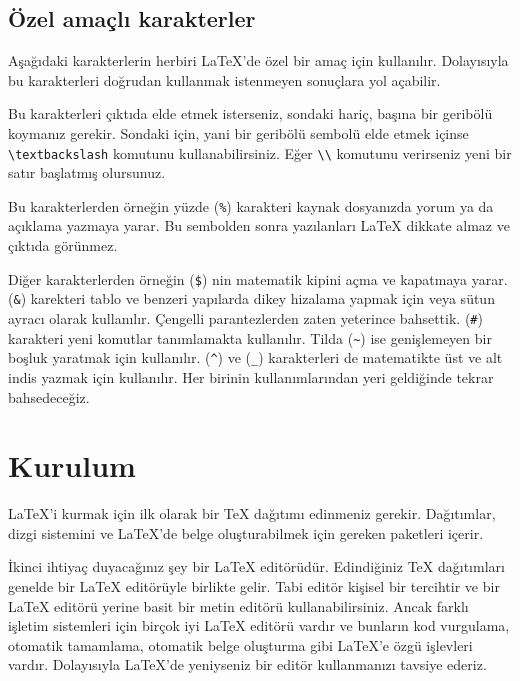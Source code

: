 \documentclass[
  10pt,
]{scrbook}
\newenvironment{Shaded}{\begin{snugshade}}{\end{snugshade}}
\newcommand{\CommentTok}[1]{\textcolor[rgb]{0.56,0.35,0.01}{\textit{#1}}}
\newcommand{\NormalTok}[1]{#1}
\newcommand{\SpecialStringTok}[1]{\textcolor[rgb]{0.31,0.60,0.02}{#1}}
\theoremstyle{definition}
\theoremstyle{definition}
\theoremstyle{definition}
\theoremstyle{definition}
\theoremstyle{remark}
\begin{document}
\hypertarget{uxf6zel-amauxe7lux131-karakterler}{%
\subsection{Özel amaçlı karakterler}\label{uxf6zel-amauxe7lux131-karakterler}}

Aşağıdaki karakterlerin herbiri LaTeX'de özel bir amaç için kullanılır.
Dolayısıyla bu karakterleri doğrudan kullanmak istenmeyen sonuçlara yol
açabilir.

\begin{Shaded}
\begin{Highlighting}[]
\NormalTok{\# }\SpecialStringTok{$ }\CommentTok{\%   \&   \{   \}   \textasciitilde{}  \^{}  \_ \textbackslash{}}
\end{Highlighting}
\end{Shaded}

Bu karakterleri çıktıda elde etmek isterseniz, sondaki hariç, başına bir
geribölü koymanız gerekir. Sondaki için, yani bir geribölü sembolü elde
etmek içinse \texttt{\textbackslash{}textbackslash} komutunu kullanabilirsiniz. Eğer \texttt{\textbackslash{}\textbackslash{}}
komutunu verirseniz yeni bir satır başlatmış olursunuz.

Bu karakterlerden örneğin yüzde (\texttt{\%}) karakteri kaynak dosyanızda yorum
ya da açıklama yazmaya yarar. Bu sembolden sonra yazılanları LaTeX
dikkate almaz ve çıktıda görünmez.

Diğer karakterlerden örneğin (\texttt{\$}) nin matematik kipini açma ve
kapatmaya yarar. (\texttt{\&}) karekteri tablo ve benzeri yapılarda dikey
hizalama yapmak için veya sütun ayracı olarak kullanılır. Çengelli
parantezlerden zaten yeterince bahsettik. (\texttt{\#}) karakteri yeni komutlar
tanımlamakta kullanılır. Tilda (\texttt{\textasciitilde{}}) ise genişlemeyen bir boşluk
yaratmak için kullanılır. (\texttt{\^{}}) ve (\texttt{\_}) karakterleri de matematikte üst
ve alt indis yazmak için kullanılır. Her birinin kullanımlarından yeri
geldiğinde tekrar bahsedeceğiz.

\hypertarget{kurulum}{%
\section{Kurulum}\label{kurulum}}

LaTeX'i kurmak için ilk olarak bir TeX dağıtımı edinmeniz gerekir.
Dağıtımlar, dizgi sistemini ve LaTeX'de belge oluşturabilmek için
gereken paketleri içerir.

İkinci ihtiyaç duyacağınız şey bir LaTeX editörüdür. Edindiğiniz TeX
dağıtımları genelde bir LaTeX editörüyle birlikte gelir. Tabi editör
kişisel bir tercihtir ve bir LaTeX editörü yerine basit bir metin
editörü kullanabilirsiniz. Ancak farklı işletim sistemleri için birçok
iyi LaTeX editörü vardır ve bunların kod vurgulama, otomatik tamamlama,
otomatik belge oluşturma gibi LaTeX'e özgü işlevleri vardır. Dolayısıyla
LaTeX'de yeniyseniz bir editör kullanmanızı tavsiye ederiz.
\end{document}
